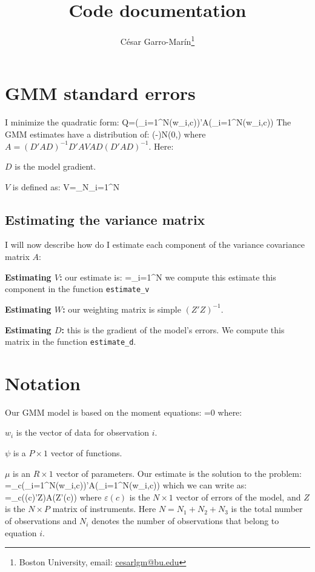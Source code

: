 \documentclass[a4paper, 12pt]{article}
\title{Code documentation}
\author{C\'esar Garro-Mar\'in\thanks{Boston University, email: \href{mailto:cesarlgm@bu.edu}{cesarlgm@bu.edu}}}
\begin{document}
\maketitle

\section{GMM standard errors}
I minimize the quadratic form:
\beqn
Q=\left(\sum_{i=1}^{N}\psi(w_i,c)\right)'A\left(\sum_{i=1}^{N}\psi(w_i,c)\right)
\eeqn 
The GMM estimates have a distribution of:
\beqns
{}(\hat\mu-\mu)\rightarrow N(0,)
\eeqns
where $A=(D'AD)^{-1}D'AVAD(D'AD)^{-1}$. Here:
\bitem
	\item $D$ is the model gradient.
	\item $V$ is defined as:
	\beqns
		V=\lim_{N\rightarrow\infty}\sum_{i=1}^N
	\eeqns

\eitem

\subsection{Estimating the variance matrix}
I will now describe how do I estimate each component of the variance covariance matrix $A$:
\bitem 
	\item \textbf{Estimating $V$:} our estimate is:
	\beqns
	=\sum_{i=1}^N
	\eeqns
	we compute this estimate this component in the function {\tt estimate\_v}
	\item \textbf{Estimating $W$:} our weighting matrix is simple $(Z'Z)^{-1}$.
	\item \textbf{Estimating $D$:} this is the gradient of the model's errors. We compute this matrix in the function {\tt estimate\_d}.
\eitem


\appendix
\section{Notation}
Our GMM model is based on the moment equations:
\beqns
	=0	
\eeqns
where:
\bitem
\item $w_i$ is the vector of data for observation $i$.
\item $\psi$ is a $P\times 1$ vector of functions.
\item $\mu$ is an $R\times 1$ vector of parameters. 
\eitem 
Our estimate is the solution to the problem:
\beqns
	\hat{\mu}=\arg\min_c\left(\sum_{i=1}^{N}\psi(w_i,c)\right)'A\left(\sum_{i=1}^{N}\psi(w_i,c)\right)
\eeqns
which we can write as:
\beqns
	\hat{\mu}=\arg\min_c\left(\varepsilon(c)'Z\right)A\left(Z'\varepsilon(c)\right)
\eeqns
where $\varepsilon(c)$ is the $N\times 1$ vector of errors of the model, and $Z$ is the $N\times P$ matrix of instruments. Here $N=N_1+N_2+N_3$ is the total number of observations and $N_i$ denotes the number of observations that belong to equation $i$. 

\end{document}
